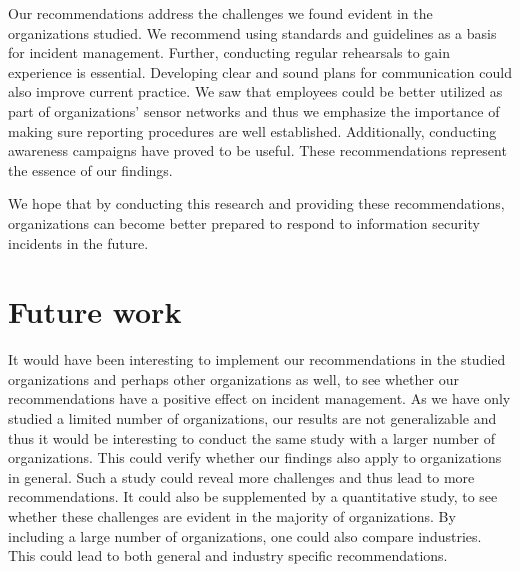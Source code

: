 Our recommendations address the challenges we found evident in the organizations studied. We recommend using standards and guidelines as a basis for incident management. Further, conducting regular rehearsals to gain experience is essential. Developing clear and sound plans for communication could also improve current practice. We saw that employees could be better utilized as part of organizations' sensor networks and thus we emphasize the importance of making sure reporting procedures are well established. Additionally, conducting awareness campaigns have proved to be useful. These recommendations represent the essence of our findings. 

We hope that by conducting this research and providing these recommendations, organizations can become better prepared to respond to information security incidents in the future.


\section{Future work}
It would have been interesting to implement our recommendations in the studied organizations and perhaps other organizations as well, to see whether our recommendations have a positive effect on incident management. As we have only studied a limited number of organizations, our results are not generalizable and thus it would be interesting to conduct the same study with a larger number of organizations. This could verify whether our findings also apply to organizations in general. Such a study could reveal more challenges and thus lead to more recommendations. It could also be supplemented by a quantitative study, to see whether these challenges are evident in the majority of organizations. By including a large number of organizations, one could also compare industries. This could lead to both general and industry specific recommendations.
